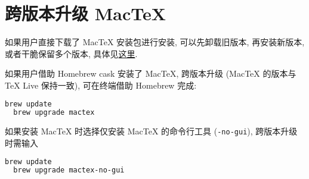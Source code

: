 \section{跨版本升级 Mac\TeX}

如果用户直接下载了 Mac\TeX{} 安装包进行安装,
可以先卸载旧版本,
再安装新版本,
或者干脆保留多个版本,
具体见\href{https://www.tug.org/mactex/multipletexdistributions.html}{这里}.

如果用户借助 Homebrew cask 安装了 Mac\TeX,
跨版本升级 (Mac\TeX{} 的版本与 \TeX{} Live 保持一致), 可在\textsf{终端}借助 Homebrew 完成:
\begin{lstlisting}[language=bash]
  brew update
  brew upgrade mactex
\end{lstlisting}

如果安装 Mac\TeX{} 时选择仅安装 Mac\TeX{} 的命令行工具 (\texttt{-no-gui}), 跨版本升级时需输入
\begin{lstlisting}[language=bash]
  brew update
  brew upgrade mactex-no-gui
\end{lstlisting}
